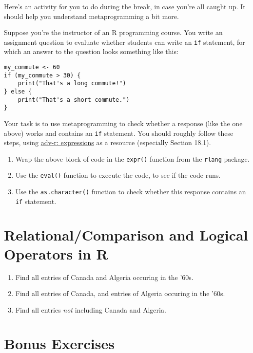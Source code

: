 \documentclass[]{article}
\providecommand{\tightlist}{%
  \setlength{\itemsep}{0pt}\setlength{\parskip}{0pt}}
\begin{document}
Here's an activity for you to do during the break, in case you're all
caught up. It should help you understand metaprogramming a bit more.

Suppose you're the instructor of an R programming course. You write an
assignment question to evaluate whether students can write an
\texttt{if} statement, for which an answer to the question looks
something like this:

\begin{verbatim}
my_commute <- 60
if (my_commute > 30) {
    print("That's a long commute!")
} else {
    print("That's a short commute.")
}
\end{verbatim}

Your task is to use metaprogramming to check whether a response (like
the one above) works and contains an \texttt{if} statement. You should
roughly follow these steps, using
\href{https://adv-r.hadley.nz/expressions.html}{adv-r: expressions} as a
resource (especially Section 18.1).

\begin{enumerate}
\def\labelenumi{\arabic{enumi}.}
\tightlist
\item
  Wrap the above block of code in the \texttt{expr()} function from the
  \texttt{rlang} package.
\item
  Use the \texttt{eval()} function to execute the code, to see if the
  code runs.
\item
  Use the \texttt{as.character()} function to check whether this
  response contains an \texttt{if} statement.
\end{enumerate}

\section{Relational/Comparison and Logical Operators in
R}\label{relationalcomparison-and-logical-operators-in-r}

\begin{enumerate}
\def\labelenumi{\arabic{enumi}.}
\item
  Find all entries of Canada and Algeria occuring in the '60s.
\item
  Find all entries of Canada, and entries of Algeria occuring in the
  '60s.
\item
  Find all entries \emph{not} including Canada and Algeria.
\end{enumerate}

\section{Bonus Exercises}\label{bonus-exercises}
\end{document}
